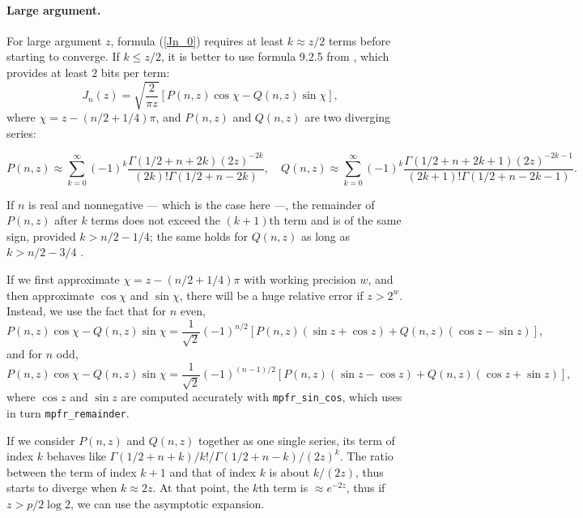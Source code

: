 \documentclass[12pt]{amsart}
\begin{document}
\paragraph{Large argument.}

For large argument $z$, formula (\ref{Jn_0}) requires at least
$k \approx z/2$ terms before starting to converge. If $k \leq z/2$, it is
better to use formula 9.2.5 from \cite{AbSt73}, which
provides at least $2$ bits per term:
\[ J_n(z) = \sqrt{\frac{2}{\pi z}} [P(n,z) \cos \chi - Q(n,z) \sin \chi], \]
where $\chi = z - (n/2 + 1/4) \pi$, and $P(n,z)$ and $Q(n,z)$ are two
diverging series:
\begin{small}
\[ P(n,z) \approx \sum_{k=0}^{\infty} (-1)^k \frac{\Gamma(1/2+n+2k) (2z)^{-2k}}
   {(2k)! \Gamma(1/2+n-2k)}, \quad
   Q(n,z) \approx \sum_{k=0}^{\infty} (-1)^k \frac{\Gamma(1/2+n+2k+1) (2z)^{-2k-1}}
   {(2k+1)! \Gamma(1/2+n-2k-1)}. \]
\end{small}
If $n$ is real and nonnegative --- which is the case here ---,
the remainder of $P(n,z)$ after $k$ terms does not exceed the $(k+1)$th term
and is of the same sign, provided $k > n/2 - 1/4$; the same holds for
$Q(n,z)$ as long as $k > n/2 - 3/4$ \cite[9.2.10]{AbSt73}.

If we first approximate $\chi = z - (n/2 + 1/4) \pi$ with working precision
$w$, and then approximate $\cos \chi$ and $\sin \chi$, there will be a huge
relative error if $z > 2^w$. Instead, we use the fact that for $n$ even,
\[ P(n,z) \cos \chi - Q(n,z) \sin \chi = \frac{1}{\sqrt{2}} (-1)^{n/2}
   [P(n,z) (\sin z + \cos z) + Q(n,z) (\cos z - \sin z)], \]
and for $n$ odd,
\[ P(n,z) \cos \chi - Q(n,z) \sin \chi = \frac{1}{\sqrt{2}} (-1)^{(n-1)/2}
   [P(n,z) (\sin z - \cos z) + Q(n,z) (\cos z + \sin z)], \]
where $\cos z$ and $\sin z$ are computed accurately with
\texttt{mpfr\_sin\_cos}, which uses in turn \texttt{mpfr\_remainder}.

If we consider $P(n,z)$ and $Q(n,z)$ together as one single series,
its term of index $k$
behaves like $\Gamma(1/2+n+k)/k!/\Gamma(1/2+n-k)/(2z)^k$.
The ratio between the
term of index $k+1$ and that of index $k$ is about $k/(2z)$, thus starts
to diverge when $k \approx 2z$. At that point, the $k$th term is
$\approx e^{-2z}$, thus if $z > p/2 \log 2$, we can use the asymptotic
expansion.
\end{document}
